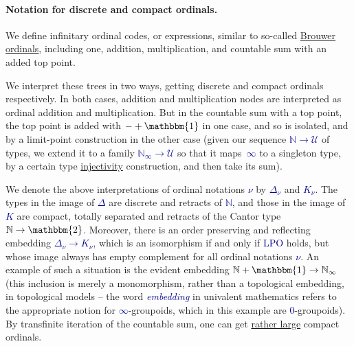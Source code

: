 \documentclass[a4paper]{easychair}
\newcommand{\db}{\textcolor{darkblue}}
\newcommand{\Kappa}{K}
\newcommand{\df}[1]{\emph{\db{#1}}}
\newcommand{\m}[1]{\db{$#1$}}
\newcommand{\N}{\mathbb{N}}
\newcommand{\NI}{\N_\infty}
\newcommand{\U}{\mathcal{U}}
\newcommand{\One}{\mathbbm{1}}
\newcommand{\Two}{\mathbbm{2}}
\begin{document}
\paragraph{Notation for discrete and compact ordinals.}
We define infinitary ordinal codes, or expressions, similar to so-called \href{http://www.cse.chalmers.se/~coquand/ordinal.ps}{Brouwer
ordinals}, including one, addition, multiplication, and countable sum
with an added top point.

We interpret these trees in two ways, getting discrete and compact
ordinals respectively. In both cases, addition and multiplication
nodes are interpreted as ordinal addition and multiplication. But in
the countable sum with a top point, the top point is added with
\m{-+\One} in one case, and so is isolated, and by a limit-point
construction in the other case (given our sequence \m{\N \to \U} of
types, we extend it to a family \m{\NI \to \U} so that it
maps~\m{\infty} to a singleton type, by a certain type
\href{https://en.wikipedia.org/wiki/Injective_object}{injectivity}
construction, and then take its sum).

We denote the above interpretations of ordinal notations \m{\nu} by
\m{\Delta_\nu} and \m{\Kappa_\nu}. The types in the image of
\m{\Delta} are discrete and retracts of \m{\N}, and those in the image
of \m{\Kappa} are compact, totally separated and retracts of the
Cantor type \m{\N \to \Two}.  Moreover, there is an order preserving
and reflecting embedding \m{\Delta_\nu \to \Kappa_\nu}, which is an
isomorphism if and only if \db{LPO} holds, but whose image always has
empty complement for all ordinal notations \m{\nu}. An example of such
a situation is the evident embedding \m{\N + \One \to \NI} (this
inclusion is merely a monomorphism, rather than a topological
embedding, in topological models -- the word \df{embedding} in
univalent mathematics refers to the appropriate notion for
\m{\infty}-groupoids, which in this example are \m{0}-groupoids).  By
transfinite iteration of the countable sum, one can get
\href{http://www.cs.swan.ac.uk/~csetzer/articles/weor0.pdf}{rather
  large} compact ordinals.
\end{document}
